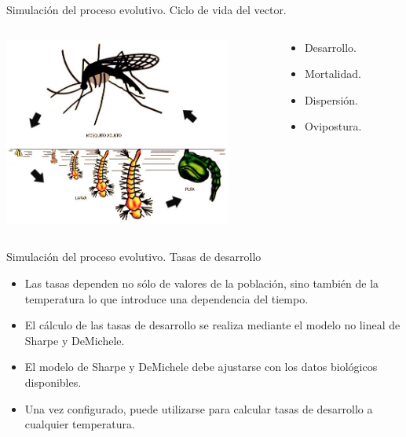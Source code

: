 \begin{frame}[c]{Simulación del proceso evolutivo. Ciclo de vida del vector.}
    \begin{columns}[t]
        \begin{column}[T]{7cm}
            \includegraphics[width=7.5cm]{./graphics/ciclo-de-vida.jpg}
        \end{column}
        \begin{column}[T]{3cm}
          \begin{itemize}
            \item Desarrollo.
            \item Mortalidad.
            \item Dispersión.
            \item Ovipostura.
          \end{itemize}
        \end{column}
    \end{columns}
\end{frame}

\begin{frame}[c]{Simulación del proceso evolutivo. Tasas de desarrollo}
  \begin{itemize}

    \item Las tasas dependen no sólo de valores de la población, sino también de la temperatura lo que introduce una dependencia del tiempo.

    \item El cálculo de las tasas de desarrollo se realiza mediante el modelo no lineal de Sharpe y DeMichele.

    \item El modelo de Sharpe y DeMichele debe ajustarse con los datos biológicos disponibles.
    \item Una vez configurado, puede utilizarse para calcular tasas de desarrollo a cualquier temperatura.
  \end{itemize}
\end{frame}

